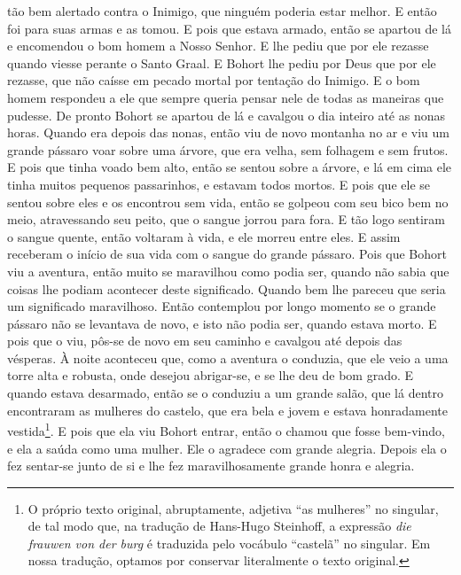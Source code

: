 tão bem alertado contra o Inimigo, que ninguém poderia estar melhor. E então
foi para suas armas e as tomou. E pois que estava armado, então se apartou de
lá e encomendou o bom homem a Nosso Senhor. E lhe pediu que por ele rezasse
quando viesse perante o Santo Graal. E Bohort lhe pediu por Deus que por ele
rezasse, que não caísse em pecado mortal por tentação do Inimigo. E o bom homem
respondeu a ele que sempre queria pensar nele de todas as maneiras que pudesse.
De pronto Bohort se apartou de lá e cavalgou o dia inteiro até as nonas horas.
Quando era depois das nonas, então viu de novo montanha no ar e viu um grande
pássaro voar sobre uma árvore, que era velha, sem folhagem e sem frutos. E pois
que tinha voado bem alto, então se sentou sobre a árvore, e lá em cima ele
tinha muitos pequenos passarinhos, e estavam todos mortos. E pois que ele se
sentou sobre eles e os encontrou sem vida, então se golpeou com seu bico bem no
meio, atravessando seu peito, que o sangue jorrou para fora. E tão logo
sentiram o sangue quente, então voltaram à vida, e ele morreu entre eles. E
assim receberam o início de sua vida com o sangue do grande pássaro.
Pois que Bohort viu a aventura, então muito se maravilhou como podia ser,
quando não sabia que coisas lhe podiam acontecer deste significado. Quando bem
lhe pareceu que seria um significado maravilhoso. Então contemplou por longo
momento se o grande pássaro não se levantava de novo, e isto não podia ser,
quando estava morto. E pois que o viu, pôs-se de novo em seu caminho e cavalgou
até depois das vésperas. À noite aconteceu que, como a aventura o conduzia, que
ele veio a uma torre alta e robusta, onde desejou abrigar-se, e se lhe deu de
bom grado. E quando estava desarmado, então se o conduziu a um grande salão,
que lá dentro encontraram as mulheres do castelo, que era bela e jovem e estava
honradamente vestida\footnote{ O próprio texto original, abruptamente, adjetiva
“as mulheres” no singular, de tal modo que, na tradução de Hans-Hugo Steinhoff,
a expressão \textit{die frauwen von der burg}  é
traduzida pelo vocábulo “castelã” no singular. Em nossa
tradução, optamos por conservar literalmente o texto original.}. E
pois que ela viu Bohort entrar, então o chamou que fosse bem-vindo, e ela a
saúda como uma mulher. Ele o agradece com grande alegria. Depois ela o fez
sentar-se junto de si e lhe fez maravilhosamente grande honra e alegria.

